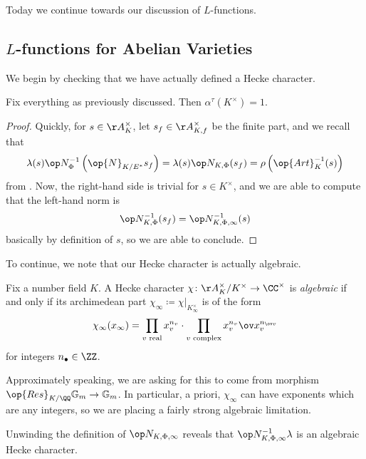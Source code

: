 \documentclass[../notes.tex]{subfiles}
\begin{document}
Today we continue towards our discussion of $L$-functions.

\subsection{\texorpdfstring{$L$}{L}-functions for Abelian Varieties}
We begin by checking that we have actually defined a Hecke character.
\begin{lemma}
	Fix everything as previously discussed. Then $\alpha^\tau(K^\times)=1$.
\end{lemma}
\begin{proof}
	Quickly, for $s\in\AA_K^\times$, let $s_f\in\AA_{K,f}^\times$ be the finite part, and we recall that
	\[\lambda(s)\op N_\Phi^{-1}\left(\op{N}_{K/E^*}s_f\right)=\lambda(s)\op N_{K,\Phi}(s_f)=\rho\left(\op{Art}_K^{-1}(s)\right)\]
	from . Now, the right-hand side is trivial for $s\in K^\times$, and we are able to compute that the left-hand norm is
	\[\op N_{K,\Phi}^{-1}(s_f)=\op N_{K,\Phi,\infty}^{-1}(s)\]
	basically by definition of $s$, so we are able to conclude.
\end{proof}
To continue, we note that our Hecke character is actually algebraic.
\begin{definition}[algebraic]
	Fix a number field $K$. A Hecke character $\chi\colon\AA_K^\times/K^\times\to\CC^\times$ is \textit{algebraic} if and only if its archi\-medean part $\chi_\infty\coloneqq\chi|_{K_\infty^\times}$ is of the form
	\[\chi_\infty(x_\infty)=\prod_{v\text{ real}}x_v^{n_v}\cdot\prod_{v\text{ complex}}x_v^{n_v}\ov x_v^{n_{\ov v}}\]
	for integers $n_\bullet\in\ZZ$.
\end{definition}
\begin{remark}
	Approximately speaking, we are asking for this to come from morphism $\op{Res}_{K/\QQ}\mathbb G_m\to\mathbb G_m$. In particular, a priori, $\chi_\infty$ can have exponents which are any integers, so we are placing a fairly strong algebraic limitation.
\end{remark}
Unwinding the definition of $\op N_{K,\Phi,\infty}$ reveals that $\op N_{K,\Phi,\infty}^{-1}\lambda$ is an algebraic Hecke character.
\end{document}
